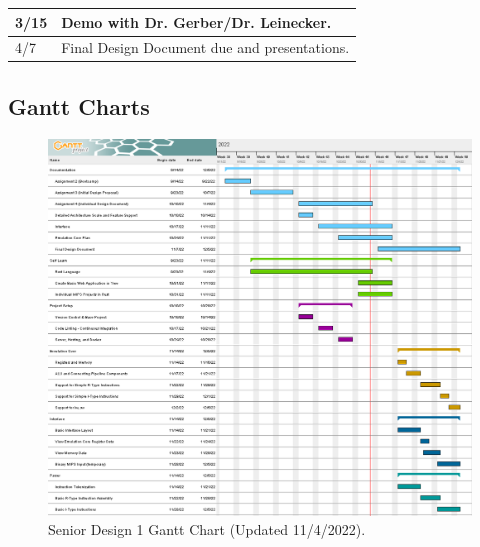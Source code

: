 \documentclass[
    paper=letter,
    parskip=half,
    fontsize=12pt,
    titlepage=firstiscover,
    toc=bibliography,
    numbers=endperiod
]{scrartcl}
\begin{document}
{\begin{tabularx}{\textwidth}{|l|X|}
        3/15          & Demo with Dr. Gerber/Dr. Leinecker.                                                                                                                                                                                                                                                                                                                                                                                                  \\\hline
        4/7           & Final Design Document due and presentations.                                                                                                                                                                                                                                                                                                                                                                                         \\\hline
    \end{tabularx}}

\subsection{Gantt Charts}

\begin{figure}[H]
    \includegraphics[width=\textwidth]{gantt-sd1}
    \caption{Senior Design 1 Gantt Chart (Updated 11/4/2022).}
\end{figure}
\end{document}
